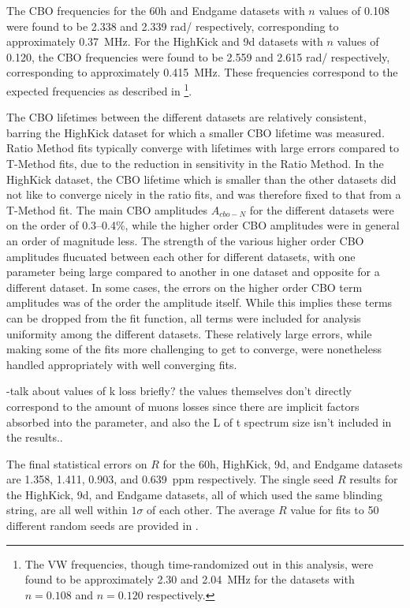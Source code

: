 The CBO frequencies for the 60h and Endgame datasets with $n$ values of 0.108 were found to be 2.338 and 2.339 rad/\mus{} respectively, corresponding to approximately \SI{0.37}{MHz}. For the HighKick and 9d datasets with $n$ values of 0.120, the CBO frequencies were found to be 2.559 and 2.615 rad/\mus{} respectively, corresponding to approximately \SI{0.415}{MHz}. These frequencies correspond to the expected frequencies as described in \footnote{The VW frequencies, though time-randomized out in this analysis, were found to be approximately \SI{2.30}{} and \SI{2.04}{MHz} for the datasets with $n=0.108$ and $n=0.120$ respectively.}.



The CBO lifetimes between the different datasets are relatively consistent, barring the HighKick dataset for which a smaller CBO lifetime was measured. Ratio Method fits typically converge with lifetimes with large errors compared to T-Method fits, due to the reduction in sensitivity in the Ratio Method. In the HighKick dataset, the CBO lifetime which is smaller than the other datasets did not like to converge nicely in the ratio fits, and was therefore fixed to that from a T-Method fit. The main CBO amplitudes $A_{cbo-N}$ for the different datasets were on the order of 0.3--0.4\%, while the higher order CBO amplitudes were in general an order of magnitude less. The strength of the various higher order CBO amplitudes flucuated between each other for different datasets, with one parameter being large compared to another in one dataset and opposite for a different dataset. In some cases, the errors on the higher order CBO term amplitudes was of the order the amplitude itself. While this implies these terms can be dropped from the fit function, all terms were included for analysis uniformity among the different datasets. These relatively large errors, while making some of the fits more challenging to get to converge, were nonetheless handled appropriately with well converging fits.



-talk about values of k loss briefly? the values themselves don't directly correspond to the amount of muons losses since there are implicit factors absorbed into the parameter, and also the L of t spectrum size isn't included in the results..





The final statistical errors on $R$ for the 60h, HighKick, 9d, and Endgame datasets are \SI{1.358}{}, \SI{1.411}{}, \SI{0.903}{}, and \SI{0.639}{ppm} respectively. The single seed $R$ results for the HighKick, 9d, and Endgame datasets, all of which used the same blinding string, are all well within $1\sigma$ of each other. The average $R$ value for fits to 50 different random seeds are provided in .



